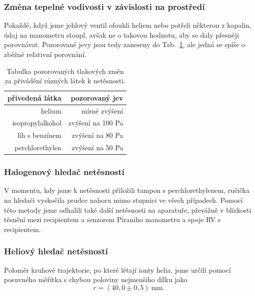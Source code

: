 \documentclass[english]{article}
\newcommand{\unit}[1]{~\mathrm{#1}}
\begin{document}
		
		\subsubsection{Změna tepelné vodivosti v závislosti na prostředí}
			Pokaždé, když jsme jehlový ventil ofoukli heliem nebo potřeli některou z kapalin, údaj na manometru stoupl, avšak ne o takovou hodnotu, aby se daly přesněji porovnávat. Pozorované jevy jsou tedy zaneseny do Tab.~\ref{tab:tepel}, ale jedná se spíše o zběžné relativní porovnání.
		
\begin{table}[htbp]
  \centering
    \begin{tabular}{|r|r|}
    \hline
    \textbf{přivedená látka} & \textbf{pozorovaný jev} \bigstrut\\
    \hline
    helium & mírné zvýšení \bigstrut\\
    \hline
    isopropylalkohol & zvýšení na 100 Pa \bigstrut\\
    \hline
    líh s benzínem & zvýšení na 80 Pa \bigstrut\\
    \hline
    perchlorethylen & zvýšení na 50 Pa \bigstrut\\
    \hline
    \end{tabular}%
  
  \caption{Tabulka pozorovaných tlakových změn za přivádění různých látek k netěsnosti.}
  \label{tab:tepel}%
\end{table}%
		

		\subsubsection{Halogenový hledač netěsností}
			V momentu, kdy jsme k netěsnosti přiložili tampon s perchlorethylenem, ručička na hledači vyskočila prudce nahoru mimo stupnici ve všech případech. Pomocí této metody jsme odhalili také další netěsnosti na aparatuře, převážně v blízkosti těsnění mezi recipientem a senzorem Piraniho manometru a spoje RV s recipientem.
		
		\subsubsection{Heliový hledač netěsností}
			Poloměr kruhové trajektorie, po které létají ionty helia, jsme určili pomocí posuvného měřítka s chybou poloviny nejmenšího dílku jako 
			\begin{equation}
				r = (40,0\pm0,5)\unit{mm}.
			\end{equation}
			
\end{document}
